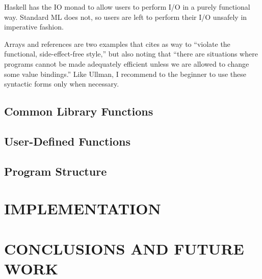 \documentclass[12pt,abstracton]{scrartcl}
\begin{document}
Haskell has the IO monad to allow users to perform I/O in a purely functional way. \cite{Jon93}
Standard ML does not, so users are left to perform their
I/O unsafely in imperative fashion.

Arrays and references are two examples that \cite{Ull98} cites as way to ``violate the functional,
side-effect-free style,'' but also noting that ``there are situations where programs cannot
be made adequately efficient unless we are allowed to change some value bindings.''
Like Ullman, I recommend to the beginner to use these syntactic forms only
when necessary.
\subsection{Common Library Functions}\label{subsec:imp}
\subsection{User-Defined Functions}\label{subsec:userfun}
\subsection{Program Structure}\label{subsec:struct}
\section{IMPLEMENTATION}\label{sec:impl}
\section{CONCLUSIONS AND FUTURE WORK}\label{sec:future}
\end{document}
